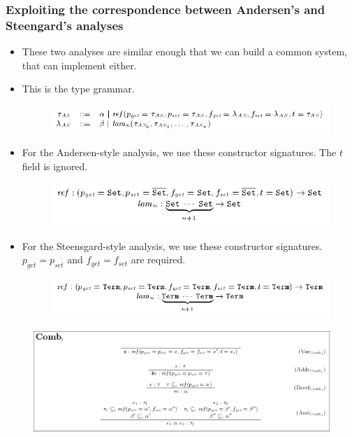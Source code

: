\documentclass{beamer}
\begin{document}
\begin{frame}[allowframebreaks]
  \frametitle{Exploiting the correspondence between Andersen's and
    Steengard's analyses}

  \begin{itemize}
  \item These two analyses are similar enough that we can build a
    common system,  that can implement either.
  \item This is the type grammar.
    \begin{figure}
      \centering
      \includegraphics[scale=0.3]{combination_type_grammar.png}
    \end{figure}
  \item For the Andersen-style analysis, we use these constructor
    signatures. The $t$ field is ignored.
    \begin{figure}
      \centering
      \includegraphics[scale=0.3]{combination_andersen_constructor_signatures.png}
    \end{figure}
  \item For the Steensgard-style analysis, we use these constructor
    signatures. $p_{get} = p_{set}$ and $f_{get} = f_{set}$ are required.
    \begin{figure}
      \centering
      \includegraphics[scale=0.3]{combination_steensgard_constructor_signatures.png}
    \end{figure}

  \end{itemize}

  \framebreak

  \begin{figure}
    \centering
    \includegraphics[scale=0.3]{combination_inference_rules.png}
  \end{figure}


\end{frame}
\end{document}
